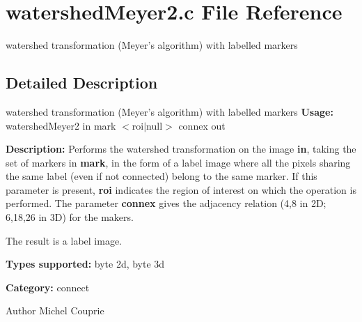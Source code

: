 \section{watershedMeyer2.c File Reference}
\label{watershedMeyer2_8c}


watershed transformation (Meyer's algorithm) with labelled markers  




\subsection{Detailed Description}
watershed transformation (Meyer's algorithm) with labelled markers {\bfseries Usage:} watershedMeyer2 in mark $<$roi$|$null$>$ connex out

{\bfseries Description:} Performs the watershed transformation on the image {\bfseries in}, taking the set of markers in {\bfseries mark}, in the form of a label image where all the pixels sharing the same label (even if not connected) belong to the same marker. If this parameter is present, {\bfseries roi} indicates the region of interest on which the operation is performed. The parameter {\bfseries connex} gives the adjacency relation (4,8 in 2D; 6,18,26 in 3D) for the makers.

The result is a label image.

{\bfseries Types supported:} byte 2d, byte 3d

{\bfseries Category:} connect

\begin{DoxyAuthor}{Author}
Michel Couprie 
\end{DoxyAuthor}

